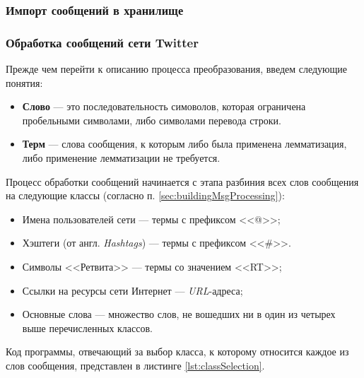     \subsubsection{Импорт сообщений в хранилище}
    \label{sec:devImporting}

    \subsubsection{Обработка сообщений сети Twitter}
    Прежде чем перейти к описанию процесса преобразования, введем следующие
    понятия:
    \begin{itemize}
        \item {\bf Слово} --- это последовательность симоволов, которая ограничена
            пробельными символами, либо символами перевода строки.
        \item {\bf Терм} --- слова сообщения, к которым либо была применена
            лемматизация, либо применение лемматизации не требуется.
    \end{itemize}


    Процесс обработки сообщений начинается с этапа разбиния всех слов сообщения
    на следующие классы (согласно п. \ref{sec:buildingMsgProcessing}):
    \begin{itemize}
        \item Имена пользователей сети \twitter --- термы с префиксом <<@>>;
        \item Хэштеги (от англ. {\it Hashtags}) --- термы с префиксом <<\#>>.
        \item Символы <<Ретвита>> --- термы со значением <<RT>>;
        \item Ссылки на ресурсы сети Интернет --- {\it URL\hspace{1pt}}-адреса;
        \item Основные слова --- множество слов, не вошедших ни в один из четырех
            выше перечисленных классов.
    \end{itemize}

    Код программы, отвечающий за выбор класса, к которому относится каждое из
    слов сообщения, представлен в листинге \ref{lst:classSelection}.

